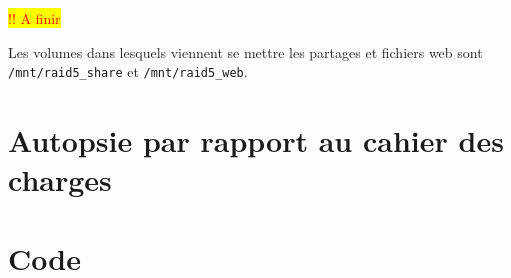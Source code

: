 \documentclass{article}
\begin{document}
	\colorbox{yellow}{\textcolor{red}{!! A finir}}
	

Les volumes dans lesquels viennent se mettre les partages et fichiers web sont \texttt{/mnt/raid5\_share} et \texttt{/mnt/raid5\_web}.



\pagebreak

\section{Autopsie par rapport au cahier des charges}

\pagebreak

\section{Code}
%	
	

	




	
\end{document}

